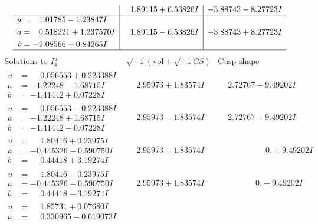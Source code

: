 \documentclass[1p]{elsarticle_modified}
\theoremstyle{definition}
\newcommand{\I}{\sqrt{-1}}
\begin{document}
$$\begin{array}{c|c|c}
 & \phantom{-}1.89115 + 6.53826 I & -3.88743 - 8.27723 I \\ \hline\begin{aligned}
u &= \phantom{-}1.01785 - 1.23847 I \\
a &= \phantom{-}0.518221 + 1.237570 I \\
b &= -2.08566 + 0.84265 I\end{aligned}
 & \phantom{-}1.89115 - 6.53826 I & -3.88743 + 8.27723 I\\
 \hline 
 \end{array}$$\newpage$$\begin{array}{c|c|c}  
\text{Solutions to }I^u_{4}& \I (\text{vol} + \sqrt{-1}CS) & \text{Cusp shape}\\
 \hline 
\begin{aligned}
u &= \phantom{-}0.056553 + 0.223388 I \\
a &= -1.22248 - 1.68715 I \\
b &= -1.41442 + 0.07228 I\end{aligned}
 & \phantom{-}2.95973 + 1.83574 I & \phantom{-}2.72767 - 9.49202 I \\ \hline\begin{aligned}
u &= \phantom{-}0.056553 - 0.223388 I \\
a &= -1.22248 + 1.68715 I \\
b &= -1.41442 - 0.07228 I\end{aligned}
 & \phantom{-}2.95973 - 1.83574 I & \phantom{-}2.72767 + 9.49202 I \\ \hline\begin{aligned}
u &= \phantom{-}1.80416 + 0.23975 I \\
a &= -0.445326 - 0.590750 I \\
b &= \phantom{-}0.44418 + 3.19274 I\end{aligned}
 & \phantom{-}2.95973 - 1.83574 I & \phantom{-0.000000 -}0. + 9.49202 I \\ \hline\begin{aligned}
u &= \phantom{-}1.80416 - 0.23975 I \\
a &= -0.445326 + 0.590750 I \\
b &= \phantom{-}0.44418 - 3.19274 I\end{aligned}
 & \phantom{-}2.95973 + 1.83574 I & \phantom{-0.000000 } 0. - 9.49202 I \\ \hline\begin{aligned}
u &= \phantom{-}1.85731 + 0.07680 I \\
a &= \phantom{-}0.330965 - 0.619073 I \\

\end{aligned}
\end{array}$$
\end{document}
